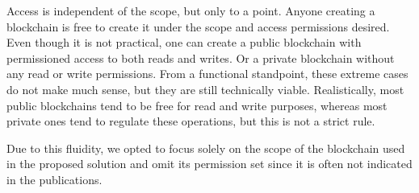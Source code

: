 \documentclass[../access.tex]{subfiles}
\begin{document}
        Access is independent of the scope, but only to a point. Anyone creating a blockchain is free to create it under the scope and access permissions desired. Even though it is not practical, one can create a public blockchain with permissioned access to both reads and writes. Or a private blockchain without any read or write permissions. From a functional standpoint, these extreme cases do not make much sense, but they are still technically viable. Realistically, most public blockchains tend to be free for read and write purposes, whereas most private ones tend to regulate these operations, but this is not a strict rule.
        \par
        Due to this fluidity, we opted to focus solely on the scope of the blockchain used in the proposed solution and omit its permission set since it is often not indicated in the publications.
\end{document}
